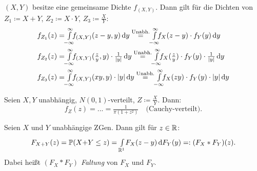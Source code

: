 \documentclass{cheat-sheet}
\renewcommand{\P}{\mathbb{P}} %
\newcommand{\E}{\mathbb{E}} %
\begin{document}
\begin{satz}
  $(X, Y)$ besitze eine gemeinsame Dichte $f_{(X, Y)}$. Dann gilt für die Dichten von $Z_1 \coloneqq X + Y$, $Z_2 \coloneqq X \cdot Y$, $Z_3 \coloneqq \tfrac{X}{Y}$:
  \begin{align*}
    f_{Z_1}(z) &= \Int{\mathclap{-\infty}}{\infty}{f_{(X, Y)}(z - y, y)}{y} \overset{\text{Unabh.}}= \Int{\mathclap{-\infty}}{\infty}{f_X(z-y) \cdot f_Y(y)}{y} \\
    f_{Z_2}(z) &= \Int{\mathclap{-\infty}}{\infty}{f_{(X, Y)}(\tfrac{z}{y}, y) \cdot \tfrac{1}{\abs{y}}}{y} \overset{\text{Unabh.}}= \Int{\mathclap{-\infty}}{\infty}{f_X(\tfrac{z}{y}) \cdot f_Y(y) \cdot \tfrac{1}{\abs{y}}}{y} \\
    f_{Z_3}(z) &= \Int{\mathclap{-\infty}}{\infty}{f_{(X, Y)}(x y, y) \cdot \abs{y}}{y} \overset{\text{Unabh.}}= \Int{\mathclap{-\infty}}{\infty}{f_X(zy) \cdot f_Y(y) \cdot \abs{y}}{y}
  \end{align*}
\end{satz}

\begin{bsp}
  Seien $X, Y$ unabhängig, $N(0,1)$-verteilt, $Z \coloneqq \tfrac{X}{Y}$. Dann:
  \[ f_Z(z) = ... = \tfrac{1}{\pi (1 + z^2)} \quad \text{(Cauchy-verteilt).} \] %
\end{bsp}

\iffalse
  \begin{bsp}
    Sei nun $X \sim F_X$ unabhängig von $Y \sim F_Y$. Dann
    \[ \E g(X, Y) = \Int{\R^2}{}{g(x,y)}{P_{(X, Y)}} = ... = \Int{\R^1}{}{\Int{\R^1}{}{g(x,y)}{P_X(x)}}{P_Y(y)} \]
    Mit Verteilungsfunktionen kann man schreiben:
    \[ \E g(X, Y) = \Int{\R^2}{}{g(x, y)}{F_{X, Y}(x, y)} = \Int{\R^1}{}{\Int{\R^1}{}{g(x, y)}{F_X(x)}}{F_Y(y)} \]
  \end{bsp}
\fi


\begin{defn}
  Seien $X$ und $Y$ unabhängige ZGen. Dann gilt für $z \in \mathbb{R}$:
  \[ F_{X{+}Y}(z) = \P(X {+} Y \leq z) = \Int{\R^1}{}{F_X(z-y)}{F_Y(y)} =: (F_X * F_Y)(z). \]
  Dabei heißt $(F_X * F_Y)$ \emph{Faltung} von $F_X$ und $F_Y$.
\end{defn}
\end{document}
